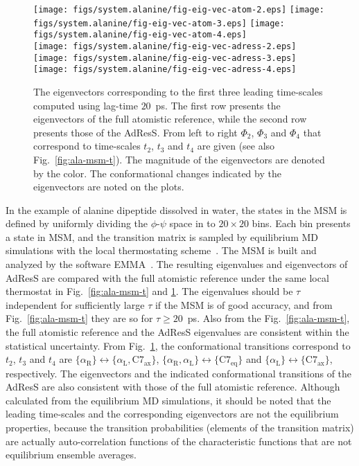 \documentclass[epjST]{svjour}
\newcommand{\confa}[0]{{\alpha_{\textrm{R}}}}
\newcommand{\confb}[0]{{\textrm{C}7_{\textrm{eq}}}}
\newcommand{\confc}[0]{{\alpha_{\textrm{L}}}}
\newcommand{\confd}[0]{{\textrm{C}7_{\textrm{ax}}}}
\begin{document}
\begin{figure}
  \centering
  \texttt{[image: figs/system.alanine/fig-eig-vec-atom-2.eps]}
  \texttt{[image: figs/system.alanine/fig-eig-vec-atom-3.eps]}
  \texttt{[image: figs/system.alanine/fig-eig-vec-atom-4.eps]}\\[-.4cm]
  \texttt{[image: figs/system.alanine/fig-eig-vec-adress-2.eps]}
  \texttt{[image: figs/system.alanine/fig-eig-vec-adress-3.eps]}
  \texttt{[image: figs/system.alanine/fig-eig-vec-adress-4.eps]}\\
  \caption{The eigenvectors corresponding to the first three leading time-scales computed using lag-time $20$~ps.
    The first row presents the eigenvectors of the full atomistic reference, while the second
    row presents those of the AdResS. From left to right $\Phi_2$, $\Phi_3$ and $\Phi_4$ that correspond to
    time-scales $t_2$, $t_3$ and $t_4$ are given (see also Fig.~\ref{fig:ala-msm-t}). The magnitude of the eigenvectors are
    denoted by the color. 
    The conformational
    changes indicated by the eigenvectors are noted on the plots.}
  \label{fig:ala-msm-v}
\end{figure}


In the example of alanine dipeptide dissolved in water, the states in the MSM
is defined by uniformly dividing the $\phi$-$\psi$ space in to $20\times 20$ bins.
Each bin presents a state in MSM, and the transition matrix is sampled by equilibrium
MD simulations with the local thermostating scheme~\cite{wang2014exploring}.
The MSM is built and analyzed by the software EMMA~\cite{senne2012emma}.
The resulting eigenvalues and eigenvectors of AdResS are compared with the full atomistic reference under the same local thermostat in
Fig.~\ref{fig:ala-msm-t} and \ref{fig:ala-msm-v}. The
eigenvalues should be $\tau$ independent for sufficiently large $\tau$ if the MSM is of good
accuracy, and from Fig.~\ref{fig:ala-msm-t} they are so for $\tau \geq 20$~ps.
Also from the Fig.~\ref{fig:ala-msm-t}, the full atomistic
reference and the AdResS eigenvalues are consistent within the statistical
uncertainty.
From Fig.~\ref{fig:ala-msm-v}, the conformational transitions correspond
to $t_2$, $t_3$ and $t_4$ are $\{\confa \} \leftrightarrow \{\confc,\confd\}$,
$\{\confa, \confc \} \leftrightarrow \{\confb\}$ and $\{\confc \} \leftrightarrow \{\confd\}$, respectively.
The eigenvectors and the indicated conformational transitions of the AdResS are also consistent with
those of the full atomistic reference. Although calculated from the
equilibrium MD simulations, it should be noted that the leading time-scales and the
corresponding eigenvectors are not the equilibrium properties, because
the transition probabilities (elements of the transition matrix) are actually
auto-correlation functions of the characteristic functions that are not equilibrium ensemble averages.
\end{document}
